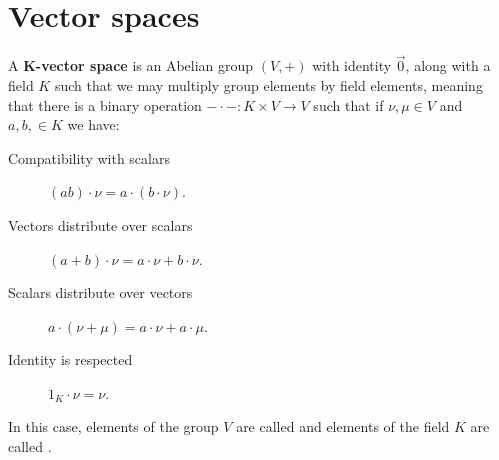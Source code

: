 \documentclass{ximera}
\begin{document}





\section{Vector spaces}


\begin{definition}
  A \textbf{$\boldsymbol{K}$-vector space} is an Abelian group $(V,+)$
  with identity $\vec{0}$, along with a field $K$ such that we may
  multiply group elements by field elements, meaning that there is a
  binary operation $-\cdot-: K\times V \to V$ such that if $\nu,\mu\in
    V$ and $a,b,\in K$ we have:
  \begin{description}
    \item[Compatibility with scalars] $(ab)\cdot \nu = a\cdot (b\cdot \nu)$.
    \item[Vectors distribute over scalars] $(a+b)\cdot \nu =
        a\cdot\nu + b\cdot \nu$.
    \item[Scalars distribute over vectors] $a\cdot (\nu+\mu) =
        a\cdot \nu + a\cdot \mu$.
    \item[Identity is respected] $1_K\cdot \nu = \nu$.
  \end{description}
  In this case, elements of the group $V$ are called  and
  elements of the field $K$ are called .
\end{definition}
\end{document}
